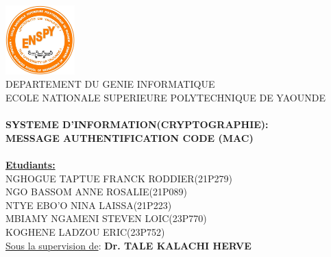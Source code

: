 \begin{titlepage}
  \begin{center}
    \includegraphics[width=0.20\textwidth]{Sections/Images/LOGO.jpg}~\\[1cm]

    \textsc{\Large DEPARTEMENT DU GENIE INFORMATIQUE\\ ECOLE NATIONALE SUPERIEURE POLYTECHNIQUE DE YAOUNDE}\\[3cm]


    \HRule \\[0.4cm]
    {\large \bfseries SYSTEME D'INFORMATION(CRYPTOGRAPHIE): \\ MESSAGE AUTHENTIFICATION CODE (MAC)\\[0.4cm]}
    \HRule \\[4cm]
    \large\textbf{\underline{Etudiants:}}\\NGHOGUE TAPTUE FRANCK RODDIER(21P279)\\NGO BASSOM ANNE ROSALIE(21P089)\\ NTYE EBO'O NINA LAISSA(21P223)\\MBIAMY NGAMENI STEVEN LOIC(23P770)\\ KOGHENE LADZOU ERIC(23P752)\\[3cm]

    \vfill
   {\large \underline{Sous la supervision de}: \textbf{Dr. TALE KALACHI HERVE}}

  \end{center}
\end{titlepage}
